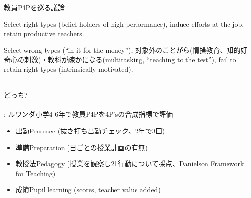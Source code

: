\begin{frame}[t, label=LeaverStart]{}
教員P4Pを巡る議論
\begin{description}
\vspace{1.0ex}\setlength{\itemsep}{1.0ex}\setlength{\baselineskip}{12pt}
\pause
\item[Pros]	Select right types (belief holders of high performance), induce efforts at the job, retain productive teachers.
\pause
\item[Cons]	Select wrong types (``in it for the money''), 対象外のことがら(情操教育、知的好奇心の刺激)・教科が疎かになる(multitasking, ``teaching to the test''), fail to retain right types (intrinsically motivated).\\~\\
\end{description}
\pause
どっち?\\~\\
\pause
\citet{Leaver2021}: ルワンダ小学4-6年で教員P4Pを4P'sの合成指標で評価
\begin{itemize}
\vspace{1.0ex}\setlength{\itemsep}{1.0ex}\setlength{\baselineskip}{12pt}
\item	出勤Presence (抜き打ち出勤チェック、2年で3回)
\item	準備Preparation (日ごとの授業計画の有無)
\item	教授法Pedagogy (授業を観察し21行動について採点、Danielson Framework for Teaching)
\item	成績Pupil learning (scores, teacher value added)
\end{itemize}
\end{frame}


